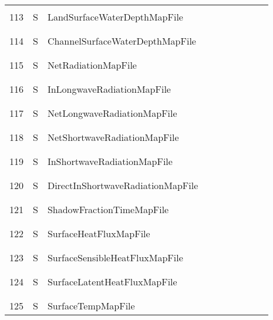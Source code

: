 \begin{longtable}{|c|c|l|c|c|c|c|p{}|c|p{}|}
&&&&&&&&&\\\hline%
&&&&&&&&&\\
113 & S & LandSurfaceWaterDepthMapFile & & & & & & & \\
&&&&&&&&&\\\hline%
&&&&&&&&&\\
114 & S & ChannelSurfaceWaterDepthMapFile & & & & & & & \\
&&&&&&&&&\\\hline%
&&&&&&&&&\\
115 & S & NetRadiationMapFile & & & & & & & \\
&&&&&&&&&\\\hline%
&&&&&&&&&\\
116 & S & InLongwaveRadiationMapFile & & & & & & & \\
&&&&&&&&&\\\hline%
&&&&&&&&&\\
117 & S & NetLongwaveRadiationMapFile & & & & & & & \\
&&&&&&&&&\\\hline%
&&&&&&&&&\\
118 & S & NetShortwaveRadiationMapFile & & & & & & & \\
&&&&&&&&&\\\hline%
&&&&&&&&&\\
119 & S & InShortwaveRadiationMapFile & & & & & & & \\
&&&&&&&&&\\\hline%
&&&&&&&&&\\
120 & S & DirectInShortwaveRadiationMapFile & & & & & & & \\
&&&&&&&&&\\\hline%
&&&&&&&&&\\
121 & S & ShadowFractionTimeMapFile & & & & & & & \\
&&&&&&&&&\\\hline%
&&&&&&&&&\\
122 & S & SurfaceHeatFluxMapFile & & & & & & & \\
&&&&&&&&&\\\hline%
&&&&&&&&&\\
123 & S & SurfaceSensibleHeatFluxMapFile & & & & & & & \\
&&&&&&&&&\\\hline%
&&&&&&&&&\\
124 & S & SurfaceLatentHeatFluxMapFile & & & & & & & \\
&&&&&&&&&\\\hline%
&&&&&&&&&\\
125 & S & SurfaceTempMapFile & & & & & & & \\

\end{longtable}
